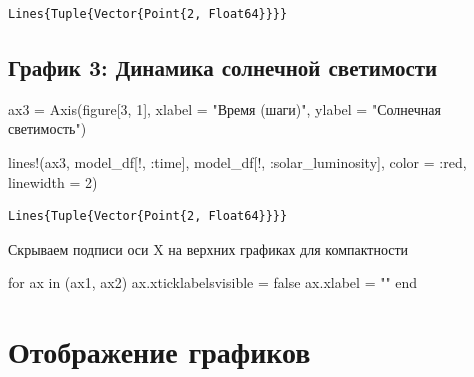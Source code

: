 \documentclass[
  12pt,
  a4paper,
  DIV=11,
  numbers=noendperiod]{scrreprt}
\newenvironment{Shaded}{\begin{snugshade}}{\end{snugshade}}
\newcommand{\ConstantTok}[1]{\textcolor[rgb]{0.56,0.35,0.01}{#1}}
\newcommand{\ControlFlowTok}[1]{\textcolor[rgb]{0.00,0.23,0.31}{#1}}
\newcommand{\FloatTok}[1]{\textcolor[rgb]{0.68,0.00,0.00}{#1}}
\newcommand{\FunctionTok}[1]{\textcolor[rgb]{0.28,0.35,0.67}{#1}}
\newcommand{\KeywordTok}[1]{\textcolor[rgb]{0.00,0.23,0.31}{#1}}
\newcommand{\NormalTok}[1]{\textcolor[rgb]{0.00,0.23,0.31}{#1}}
\newcommand{\OperatorTok}[1]{\textcolor[rgb]{0.37,0.37,0.37}{#1}}
\newcommand{\StringTok}[1]{\textcolor[rgb]{0.13,0.47,0.30}{#1}}
\begin{document}
\begin{verbatim}
Lines{Tuple{Vector{Point{2, Float64}}}}
\end{verbatim}

\subsection{График 3: Динамика солнечной
светимости}\label{ux433ux440ux430ux444ux438ux43a-3-ux434ux438ux43dux430ux43cux438ux43aux430-ux441ux43eux43bux43dux435ux447ux43dux43eux439-ux441ux432ux435ux442ux438ux43cux43eux441ux442ux438}

\begin{Shaded}
\begin{Highlighting}[]
\NormalTok{ax3 }\OperatorTok{=} \FunctionTok{Axis}\NormalTok{(figure[}\FloatTok{3}\NormalTok{, }\FloatTok{1}\NormalTok{],}
\NormalTok{           xlabel }\OperatorTok{=} \StringTok{"Время (шаги)"}\NormalTok{,}
\NormalTok{           ylabel }\OperatorTok{=} \StringTok{"Солнечная светимость"}\NormalTok{)}

\FunctionTok{lines!}\NormalTok{(ax3, model\_df[!, }\OperatorTok{:}\NormalTok{time], model\_df[!, }\OperatorTok{:}\NormalTok{solar\_luminosity],}
\NormalTok{       color }\OperatorTok{=} \OperatorTok{:}\NormalTok{red, linewidth }\OperatorTok{=} \FloatTok{2}\NormalTok{)}
\end{Highlighting}
\end{Shaded}

\begin{verbatim}
Lines{Tuple{Vector{Point{2, Float64}}}}
\end{verbatim}

Скрываем подписи оси X на верхних графиках для компактности

\begin{Shaded}
\begin{Highlighting}[]
\ControlFlowTok{for}\NormalTok{ ax }\KeywordTok{in}\NormalTok{ (ax1, ax2)}
\NormalTok{    ax.xticklabelsvisible }\OperatorTok{=} \ConstantTok{false}
\NormalTok{    ax.xlabel }\OperatorTok{=} \StringTok{""}
\ControlFlowTok{end}
\end{Highlighting}
\end{Shaded}

\section{Отображение
графиков}\label{ux43eux442ux43eux431ux440ux430ux436ux435ux43dux438ux435-ux433ux440ux430ux444ux438ux43aux43eux432}
\end{document}
